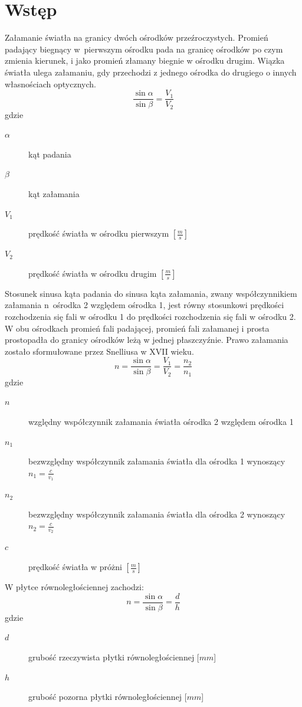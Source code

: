 \documentclass[a4paper,11pt]{article}
\begin{document}
\section{Wstęp}
\indent Załamanie światła na granicy dwóch ośrodków przeźroczystych. Promień padający biegnący w~pierwszym ośrodku pada na granicę ośrodków po czym zmienia kierunek, i jako promień złamany biegnie w ośrodku drugim.	
Wiązka światła ulega załamaniu, gdy przechodzi z jednego ośrodka do drugiego o innych własnościach optycznych.
\begin{equation}
\frac{\sin{\alpha}}{\sin{\beta}} = \frac{V_1}{V_2}
\end{equation}
gdzie 
\begin{description}
\item [$\alpha$] kąt padania
\item [$\beta$] kąt załamania
\item [$V_{1}$] prędkość światła w ośrodku pierwszym $\left[\frac{m}{s}\right]$
\item [$V_{2}$] prędkość światła w ośrodku drugim $\left[\frac{m}{s}\right]$
\end{description}

\indent Stosunek sinusa kąta padania do sinusa kąta załamania, zwany współczynnikiem załamania n~ośrodka 2 względem ośrodka 1, jest równy stosunkowi prędkości rozchodzenia się fali w ośrodku 1 do prędkości rozchodzenia się fali w ośrodku 2. W obu ośrodkach promień fali padającej, promień fali załamanej i prosta prostopadła do granicy ośrodków leżą w jednej płaszczyźnie. Prawo załamania zostało sformułowane przez Snelliusa w XVII wieku. \\
\begin{equation}
n = \frac{\sin{\alpha}}{\sin{\beta}} = \frac{V_1}{V_2} = \frac{n_2}{n_1}
\end{equation}
gdzie 
\begin{description}
\item [$n$] względny współczynnik załamania światła ośrodka 2 względem ośrodka 1
\item [$n_{1}$] bezwzględny współczynnik załamania światła dla ośrodka 1 wynoszący $n_{1}=\frac{c}{v_1}$
\item [$n_{2}$] bezwzględny współczynnik załamania światła dla ośrodka 2 wynoszący $n_{2}=\frac{c}{v_2}$
\item [$c$] prędkość światła w próżni $\left[\frac{m}{s}\right]$
\end{description}

W płytce równoległościennej zachodzi:
\begin{equation}
\label{wzor:n}
n = \frac{\sin{\alpha}}{\sin{\beta}} = \frac{d}{h}
\end{equation}
gdzie 
\begin{description}
\item [$d$] grubość rzeczywista płytki równoległościennej [$mm$]
\item [$h$] grubość pozorna płytki równoległościennej [$mm$]
\end{description}
\end{document}

